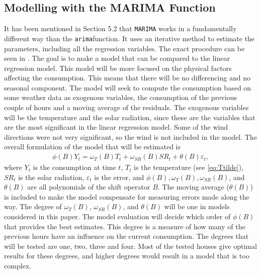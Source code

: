 \subsection{Modelling with the MARIMA Function}
It has been mentioned in Section 5.2 that \texttt{MARIMA} works in a fundamentally different way than the \texttt{arima}function. It uses an iterative method to estimate the parameters, including all the regression variables. The exact procedure can be seen in \cite{marima}. The goal is to make a model that can be compared to the linear regression model. This model will be more focused on the physical factors affecting the consumption. This means that there will be no differencing and no seasonal component. The model will seek to compute the consumption based on some weather data as exogenous variables, the consumption of the previous couple of hours and a moving average of the residuals. The exogenous variables will be the temperature and the solar radiation, since these are the variables that are the most significant in the linear regression model. Some of the wind directions were not very significant, so the wind is not included in the model. The overall formulation of the model that will be estimated is
\begin{align}
    \phi (B) Y_t =  \omega_{T}(B)T_t + \omega_{SR}(B)SR_t + \theta (B) \varepsilon_t,
    \label{eq:MARIMA1}
\end{align}
where $Y_t$ is the consumption at time $t$, $T_t$ is the temperature (see \cref{eq:Ttilde}), $SR_t$ is the solar radiation, $\varepsilon_t$ is the error, and $\phi(B), \omega_{T}(B), \omega_{SR}(B)$, and $\theta(B)$ are all polynomials of the shift operator $B$. The moving average ($\theta(B)$) is included to make the model compensate for measuring errors made along the way. The degree of $\omega_{T}(B)$, $\omega_{SR}(B)$, and $\theta(B)$ will be one in models considered in this paper. The model evaluation will decide which order of $\phi(B)$ that provides the best estimates. This degree is a measure of how many of the previous hours have an influence on the current consumption. The degrees that will be tested are one, two, three and four. Most of the tested houses give optimal results for these degrees, and higher degrees would result in a model that is too complex.

